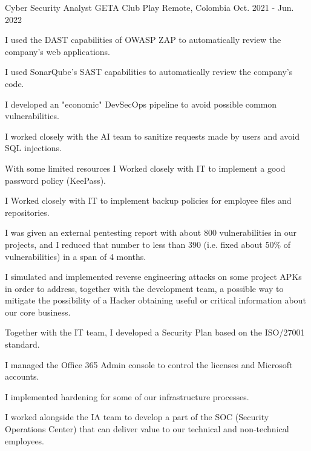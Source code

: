 \begin{cventries}
  \cventry
    {Cyber Security Analyst} %
    {GETA Club Play} %
    {Remote, Colombia} %
    {Oct. 2021 - Jun. 2022} %
    {
      \begin{cvitems} %
        \item {I used the DAST capabilities of OWASP ZAP to automatically review the company's web
        applications.}
        \item {I used SonarQube's SAST capabilities to automatically review the company's code.}
        \item {I developed an "economic" DevSecOps pipeline to avoid possible common 
        vulnerabilities.}
        \item {I worked closely with the AI team to sanitize requests made by users and avoid SQL
        injections.}
        \item {With some limited resources I Worked closely with IT to implement a good password 
        policy (KeePass).}
        \item {I Worked closely with IT to implement backup policies for employee files and
        repositories.}
        \item {I was given an external pentesting report with about 800 vulnerabilities in our
        projects, and I reduced that number to less than 390 (i.e. fixed about 50\% of
        vulnerabilities) in a span of 4 months.}
        \item {I simulated and implemented reverse engineering attacks on some project APKs in order
        to address, together with the development team, a possible way to mitigate the possibility
        of a Hacker obtaining useful or critical information about our core business.}
        \item {Together with the IT team, I developed a Security Plan based on the ISO/27001
        standard.}
        \item {I managed the Office 365 Admin console to control the licenses and Microsoft 
        accounts.}
        \item {I implemented hardening for some of our infrastructure processes.}
        \item {I worked alongside the IA team to develop a part of the SOC (Security Operations
        Center) that can deliver value to our technical and non-technical employees.}
      \end{cvitems}
    }


\end{cventries}
